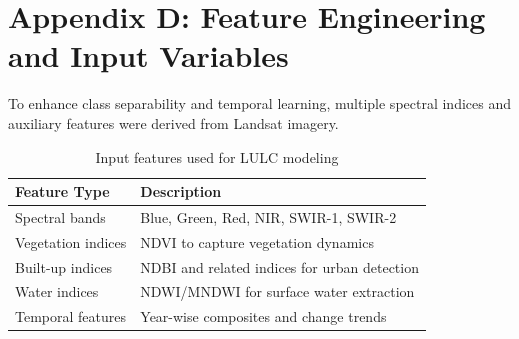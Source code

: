 \documentclass[main]{subfiles}
\begin{document}
\section*{Appendix D: Feature Engineering and Input Variables}

To enhance class separability and temporal learning, multiple spectral indices and auxiliary features were derived from Landsat imagery.

\begin{table}[h]
\centering
\caption{Input features used for LULC modeling}
\begin{tabular}{|p{4cm}|p{7cm}|}
\hline
\textbf{Feature Type} & \textbf{Description} \\
\hline
Spectral bands & Blue, Green, Red, NIR, SWIR-1, SWIR-2 \\
\hline
Vegetation indices & NDVI to capture vegetation dynamics \\
\hline
Built-up indices & NDBI and related indices for urban detection \\
\hline
Water indices & NDWI/MNDWI for surface water extraction \\
\hline
Temporal features & Year-wise composites and change trends \\
\hline
\end{tabular}
\end{table}
\end{document}
